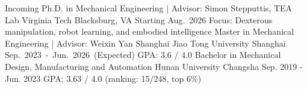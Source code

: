 
\begin{cventries}
	\cventry
	{Incoming Ph.D. in Mechanical Engineering | Advisor: Simon Stepputtis, TEA Lab} %
	{Virginia Tech} %
	{Blacksburg, VA} %
	{Starting Aug.~2026} %
	{
        Focus: Dexterous manipulation, robot learning, and embodied intelligence
	}%
	\cventry
	{Master in Mechanical Engineering | Advisor: Weixin Yan} %
	{Shanghai Jiao Tong University} %
	{Shanghai} %
	{Sep.~2023~-~Jun.~2026~(Expected)} %
	{
        GPA: 3.6 / 4.0
	}%
	\cventry
	{Bachelor in Mechanical Design, Manufacturing and Automation} %
	{Hunan University} %
	{Changsha} %
	{Sep. 2019 - Jun. 2023} %
	{
        GPA: 3.63 / 4.0 (ranking: 15/248, top 6\%)
	}%
	\vspace{3mm}
\end{cventries}
